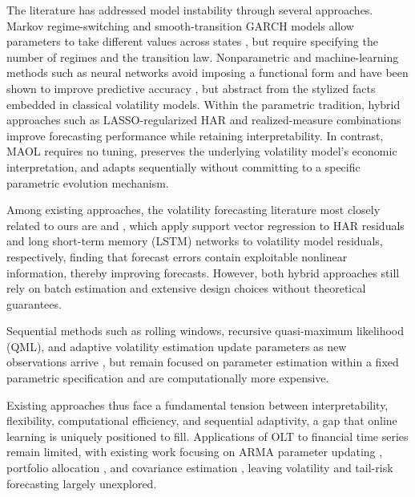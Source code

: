 The literature has addressed model instability through several approaches. Markov regime-switching and smooth-transition GARCH models allow parameters to take different values across states \citep{Hamilton1989, CrealKoopmanLucas2013, harvey2013dynamic}, but require specifying the number of regimes and the transition law. Nonparametric and machine-learning methods such as neural networks avoid imposing a functional form and have been shown to improve predictive accuracy \citep{Buhlmann2002, Donaldson1997}, but abstract from the stylized facts embedded in classical volatility models. Within the parametric tradition, hybrid approaches such as LASSO-regularized HAR and realized-measure combinations improve forecasting performance \citep{AudrinoKnaus2016, BezerraAlbuquerque2017} while retaining interpretability. In contrast, MAOL requires no tuning, preserves the underlying volatility model's economic interpretation, and adapts sequentially without committing to a specific parametric evolution mechanism.

Among existing approaches, the volatility forecasting literature most closely related to ours are \citet{ZhuoMorimoto2024} and \citet{TapiaKristjanpoller2022}, which apply support vector regression to HAR residuals and long short-term memory (LSTM) networks to volatility model residuals, respectively, finding that forecast errors contain exploitable nonlinear information, thereby improving forecasts. However, both hybrid approaches still rely on batch estimation and extensive design choices without theoretical guarantees.

Sequential methods such as rolling windows, recursive quasi-maximum likelihood (QML), and adaptive volatility estimation update parameters as new observations arrive \citep{PesaranTimmermann2007, Dahlhaus2007, Werge2022}, but remain focused on parameter estimation within a fixed parametric specification and are computationally more expensive.

Existing approaches thus face a fundamental tension between interpretability, flexibility, computational efficiency, and sequential adaptivity, a gap that online learning is uniquely positioned to fill. Applications of OLT to financial time series remain limited, with existing work focusing on ARMA parameter updating \citep{AnavaHazanMannorShamir2013, liu2016onlinearima}, portfolio allocation \citep{stoltz2005internal, li2013onlineportfolio}, and covariance estimation \citep{johansson2024covariance}, leaving volatility and tail-risk forecasting largely unexplored.

